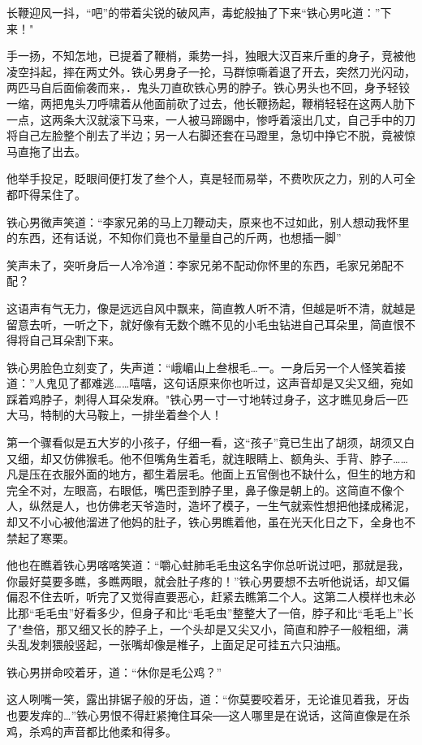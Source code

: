 \documentclass[12pt,oneside]{book}
\begin{document}
长鞭迎风一抖，``吧''的带着尖锐的破风声，毒蛇般抽了下来``铁心男叱道：''下来！"

手一扬，不知怎地，已提着了鞭梢，乘势一抖，独眼大汉百来斤重的身子，竞被他凌空抖起，摔在两丈外。铁心男身子一抡，马群惊嘶着退了开去，突然刀光闪动，两匹马自后面偷袭而来，．鬼头刀直砍铁心男的脖子。铁心男头也不回，身予轻铰一缩，两把鬼头刀呼啸着从他面前砍了过去，他长鞭扬起，鞭梢轻轻在这两人肋下一点，这两条大汉就滚下马来，一人被马蹄踢中，惨呼着滚出几丈，自己手中的刀将自己左脸整个削去了半边；另一人右脚还套在马蹬里，急切中挣它不脱，竟被惊马直拖了出去。

他举手投足，眨眼间便打发了叁个人，真是轻而易举，不费吹灰之力，别的人可全都吓得呆住了。

铁心男微声笑道：``李家兄弟的马上刀鞭动夫，原来也不过如此，别人想动我怀里的东西，还有话说，不知你们竟也不量量自己的斤两，也想插一脚''

笑声未了，突听身后一人冷冷道：李家兄弟不配动你怀里的东西，毛家兄弟配不配？

这语声有气无力，像是远远自风中飘来，简直教人听不清，但越是听不清，就越是留意去听，一听之下，就好像有无数个瞧不见的小毛虫钻进自己耳朵里，简直恨不得将自己耳朵割下来。

铁心男脸色立刻变了，失声道：``峨嵋山上叁根毛\ldots 一。一身后另一个人怪笑着接道：''人鬼见了都难逃\ldots\ldots 嘻嘻，这句话原来你也听过，这声音却是又尖又细，宛如踩着鸡脖子，刺得人耳朵发麻。"铁心男一寸一寸地转过身子，这才瞧见身后一匹大马，特制的大马鞍上，一排坐着叁个人！

第一个骤看似是五大岁的小孩子，仔细一看，这``孩子''竟已生出了胡须，胡须又白又细，却又仿佛猴毛。他不但嘴角生着毛，就连眼睛上、额角头、手背、脖子\ldots\ldots 凡是压在衣服外面的地方，都生着层毛。他面上五官倒也不缺什么，但生的地方和完全不对，左眼高，右眼低，嘴巴歪到脖子里，鼻子像是朝上的。这简直不像个人，纵然是人，也仿佛老天爷造时，造坏了模子，一生气就索性想把他揉成稀泥，却又不小心被他溜进了他妈的肚子，铁心男瞧着他，虽在光天化日之下，全身也不禁起了寒栗。

他也在瞧着铁心男喀喀笑道：``嚼心蛀肺毛毛虫这名字你总听说过吧，那就是我，你最好莫要多瞧，多瞧两眼，就会肚子疼的！''铁心男要想不去听他说话，却又偏偏忍不住去听，听完了又觉得直要恶心，赶紧去瞧第二个人。这第二人模样也未必比那``毛毛虫''好看多少，但身子和比``毛毛虫''整整大了一倍，脖子和比``毛毛上''长了"叁倍，那又细又长的脖子上，一个头却是又尖又小，简直和脖子一般粗细，满头乱发刺猥般竖起，一张嘴却像是椎子，上面足足可挂五六只油瓶。

铁心男拼命咬着牙，道：``休你是毛公鸡？''

这人咧嘴一笑，露出排锯子般的牙齿，道：``你莫要咬着牙，无论谁见着我，牙齿也要发痒的\ldots{}''铁心男恨不得赶紧掩住耳朵──这人哪里是在说话，这简直像是在杀鸡，杀鸡的声音都比他柔和得多。
\end{document}
